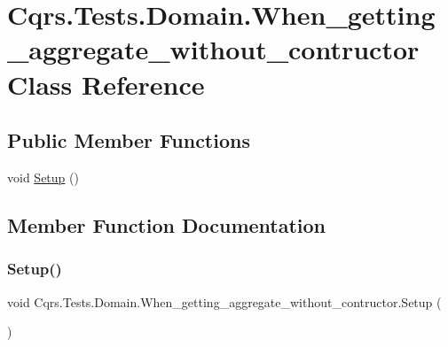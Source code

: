 \hypertarget{classCqrs_1_1Tests_1_1Domain_1_1When__getting__aggregate__without__contructor}{}\section{Cqrs.\+Tests.\+Domain.\+When\+\_\+getting\+\_\+aggregate\+\_\+without\+\_\+contructor Class Reference}
\label{classCqrs_1_1Tests_1_1Domain_1_1When__getting__aggregate__without__contructor}
\subsection*{Public Member Functions}
\begin{DoxyCompactItemize}
\item 
void \hyperlink{classCqrs_1_1Tests_1_1Domain_1_1When__getting__aggregate__without__contructor_a65bf40db9c414f3c79604a9aa08941be}{Setup} ()
\end{DoxyCompactItemize}


\subsection{Member Function Documentation}
\mbox{\label{classCqrs_1_1Tests_1_1Domain_1_1When__getting__aggregate__without__contructor_a65bf40db9c414f3c79604a9aa08941be}} 
\subsubsection{\texorpdfstring{Setup()}{Setup()}}
{\footnotesize\ttfamily void Cqrs.\+Tests.\+Domain.\+When\+\_\+getting\+\_\+aggregate\+\_\+without\+\_\+contructor.\+Setup (\begin{DoxyParamCaption}{ }\end{DoxyParamCaption})}

